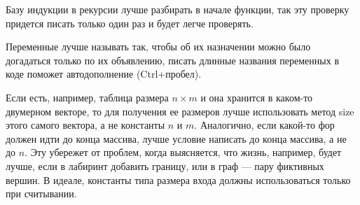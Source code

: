 \documentclass[12pt,a4paper,russian]{article}
\begin{document}
Базу индукции в рекурсии лучше разбирать в начале функции, так эту проверку придется писать только один раз и будет легче проверять.

Переменные лучше называть так, чтобы об их назначении можно было догадаться только по их объявлению, писать длинные названия переменных в коде поможет автодополнение (Ctrl+пробел).

Если есть, например, таблица размера $n \times m$ и она хранится в каком-то двумерном векторе, то для получения ее размеров лучше использовать метод size этого самого вектора, а не константы $n$ и $m$. Аналогично, если какой-то фор должен идти до конца массива, лучше условие написать до конца массива, а не до $n$. Эту убережет от проблем, когда выясняется, что жизнь, например, будет лучше, если в лабиринт добавить границу, или в граф --- пару фиктивных вершин. В идеале, константы типа размера входа должны использоваться только при считывании.
\end{document}
